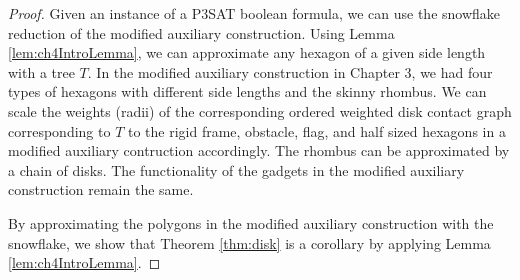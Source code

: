 \documentclass[10pt]{CSUNthesis}
\theoremstyle{plain}%
\theoremstyle{definition}
\theoremstyle{remark}
\begin{document}
\begin{proof}
Given an instance of a P3SAT boolean formula, we can use the snowflake reduction of the modified auxiliary construction.  
Using Lemma \ref{lem:ch4IntroLemma}, we can approximate any hexagon of a given side length with a tree $T$.  
In the modified auxiliary construction in Chapter 3, we had four types of hexagons with different side lengths and the skinny rhombus.  
We can scale the weights (radii) of the corresponding ordered weighted disk contact graph corresponding to $T$ to the rigid frame, obstacle, flag, and half sized hexagons in a modified auxiliary contruction accordingly.  
The rhombus can be approximated by a chain of disks.  
The functionality of the gadgets in the modified auxiliary construction remain the same.

By approximating the polygons in the modified auxiliary construction with the snowflake, we show that Theorem \ref{thm:disk} is a corollary by applying Lemma \ref{lem:ch4IntroLemma}.  
\end{proof}



\end{document}
